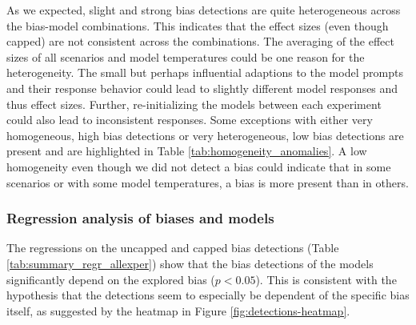 \par As we expected, slight and strong bias detections are quite heterogeneous across the bias-model combinations. This indicates that the effect sizes (even though capped) are not consistent across the combinations. The averaging of the effect sizes of all scenarios and model temperatures could be one reason for the heterogeneity. The small but perhaps influential adaptions to the model prompts and their response behavior could lead to slightly different model responses and thus effect sizes. Further, re-initializing the models between each experiment could also lead to inconsistent responses. Some exceptions with either very homogeneous, high bias detections or very heterogeneous, low bias detections are present and are highlighted in Table \ref{tab:homogeneity_anomalies}. A low homogeneity even though we did not detect a bias could indicate that in some scenarios or with some model temperatures, a bias is more present than in others.

\subsubsection{Regression analysis of biases and models}
\par The regressions on the uncapped and capped bias detections (Table \ref{tab:summary_regr_allexper}) show that the bias detections of the models significantly depend on the explored bias ($p < 0.05$). This is consistent with the hypothesis that the detections seem to especially be dependent of the specific bias itself, as suggested by the heatmap in Figure \ref{fig:detections-heatmap}.

